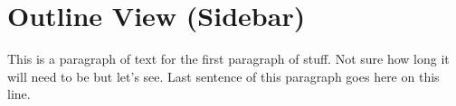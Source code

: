 \chapter{Outline View (Sidebar)}

This is a paragraph of text for the first paragraph of stuff. Not sure how long it will need to be but let's see. Last sentence of this paragraph goes here on this line.
